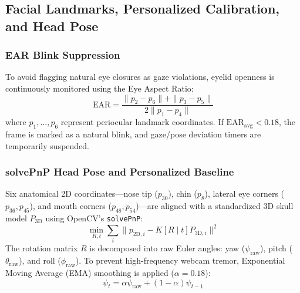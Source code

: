 \documentclass[conference]{IEEEtran}
\begin{document}
\subsection{Facial Landmarks, Personalized Calibration, and Head Pose}

\subsubsection{EAR Blink Suppression}
To avoid flagging natural eye closures as gaze violations, eyelid openness is continuously monitored using the Eye Aspect Ratio:
\begin{equation}
\text{EAR} = \frac{\|p_2 - p_6\| + \|p_3 - p_5\|}{2\|p_1 - p_4\|}
\label{eq:ear}
\end{equation}
where $p_1, \dots, p_6$ represent periocular landmark coordinates. If $\text{EAR}_{\text{avg}} < 0.18$, the frame is marked as a natural blink, and gaze/pose deviation timers are temporarily suspended.

\subsubsection{solvePnP Head Pose and Personalized Baseline}
Six anatomical 2D coordinates—nose tip ($p_{30}$), chin ($p_8$), lateral eye corners ($p_{36}, p_{45}$), and mouth corners ($p_{48}, p_{54}$)—are aligned with a standardized 3D skull model $P_{\text{3D}}$ using OpenCV's \texttt{solvePnP}:
\begin{equation}
\min_{R, t} \sum_{i} \|p_{\text{2D},i} - K [R \mid t] P_{\text{3D},i}\|^2
\label{eq:pnp}
\end{equation}
The rotation matrix $R$ is decomposed into raw Euler angles: yaw ($\psi_{\text{raw}}$), pitch ($\theta_{\text{raw}}$), and roll ($\phi_{\text{raw}}$). To prevent high-frequency webcam tremor, Exponential Moving Average (EMA) smoothing is applied ($\alpha = 0.18$):
\begin{equation}
\psi_t = \alpha \psi_{\text{raw}} + (1 - \alpha) \psi_{t-1}
\label{eq:ema}
\end{equation}
\end{document}
